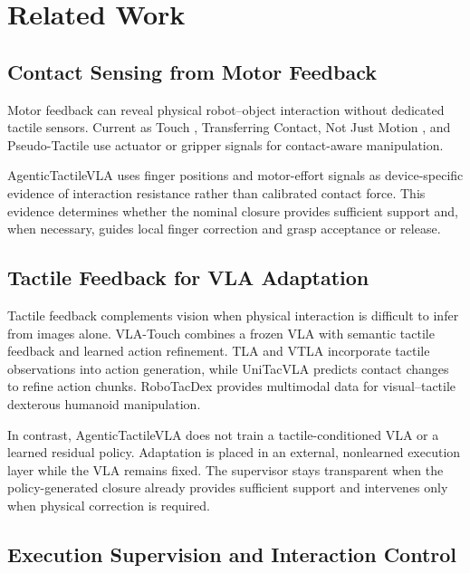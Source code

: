 \documentclass[letterpaper,10pt,conference]{ieeeconf}
\begin{document}
\section{Related Work}

\subsection{Contact Sensing from Motor Feedback}

Motor feedback can reveal physical robot--object interaction without dedicated
tactile sensors. Current as Touch \cite{currentastouch}, Transferring Contact,
Not Just Motion \cite{contacttransfer}, and Pseudo-Tactile
\cite{pseudotactile} use actuator or gripper signals for contact-aware
manipulation.

AgenticTactileVLA uses finger positions and motor-effort signals as
device-specific evidence of interaction resistance rather than calibrated
contact force. This evidence determines whether the nominal closure provides
sufficient support and, when necessary, guides local finger correction and
grasp acceptance or release.

\subsection{Tactile Feedback for VLA Adaptation}

Tactile feedback complements vision when physical interaction is difficult to
infer from images alone. VLA-Touch \cite{vlatouch} combines a frozen VLA with
semantic tactile feedback and learned action refinement. TLA \cite{tla} and
VTLA \cite{vtla} incorporate tactile observations into action generation,
while UniTacVLA \cite{unitacvla} predicts contact changes to refine action
chunks. RoboTacDex \cite{robotacdex} provides multimodal data for
visual--tactile dexterous humanoid manipulation.

In contrast, AgenticTactileVLA does not train a tactile-conditioned VLA or a
learned residual policy. Adaptation is placed in an external, nonlearned
execution layer while the VLA remains fixed. The supervisor stays transparent
when the policy-generated closure already provides sufficient support and
intervenes only when physical correction is required.

\subsection{Execution Supervision and Interaction Control}
\end{document}
